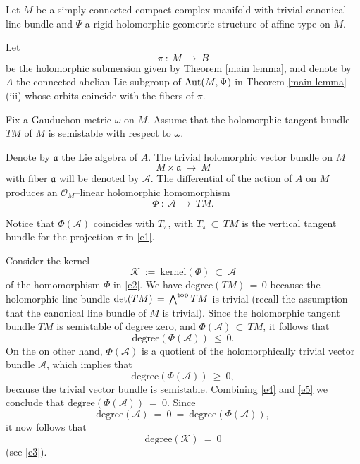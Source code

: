 \documentclass[12pt,reqno]{amsart}
\theoremstyle{definition}
\numberwithin{equation}{section}
\begin{document}
Let $M$ be a simply connected compact complex manifold with trivial canonical line bundle and $\Psi$ a rigid 
holomorphic geometric structure of affine type on $M$.

Let
\begin{equation}\label{e1}
\pi\ :\ M\ \longrightarrow\ B
\end{equation}
be the holomorphic submersion given by Theorem \ref{main lemma}, and denote by $A$ the connected abelian 
Lie subgroup of ${\rm Aut}(M, \Psi)$ in Theorem \ref{main lemma}(iii) whose orbits coincide with the fibers 
of $\pi$.

Fix a Gauduchon metric $\omega$ on $M$. Assume that the holomorphic tangent bundle $TM$ of $M$ is 
semistable with respect to $\omega$.

Denote by $\mathfrak a$ the Lie algebra of $A$. The trivial holomorphic vector bundle on $M$
$$
M\times {\mathfrak a}\ \longrightarrow\ M
$$
with fiber $\mathfrak a$ will be denoted by $\mathcal A$. The differential of the action of $A$ on $M$
produces an ${\mathcal O}_M$--linear holomorphic homomorphism 
\begin{equation}\label{e2}
\Phi\ :\ \mathcal A \ \longrightarrow\ TM.
\end{equation}

Notice that $\Phi(\mathcal A)$ coincides with $T_{\pi}$, with $T_\pi\, \subset\, TM$ is the vertical
tangent bundle for the projection $\pi$ in \eqref{e1}. 

Consider the kernel
\begin{equation}\label{e3}
{\mathcal K}\ := \ \text{kernel}(\Phi) \ \subset\ \mathcal A
\end{equation}
of the homomorphism $\Phi$ in \eqref{e2}. We have $\text{degree}(TM)\,=\, 0$ because the holomorphic
line bundle $\det(TM)\,=\, \bigwedge^{\rm top}TM$ is trivial (recall the assumption that the
canonical line bundle of $M$ is trivial). Since the holomorphic tangent bundle $TM$ is semistable of
degree zero, and $\Phi(\mathcal A)\, \subset\, TM$, it follows that
\begin{equation}\label{e4}
\text{degree}(\Phi(\mathcal A)) \ \leq \ 0.
\end{equation}
On the on other hand, $\Phi(\mathcal A)$ is a quotient of the holomorphically trivial vector
bundle $\mathcal A$, which implies that
\begin{equation}\label{e5}
\text{degree}(\Phi(\mathcal A)) \ \geq \ 0,
\end{equation}
because the trivial vector bundle is semistable.
Combining \eqref{e4} and \eqref{e5} we conclude that $\text{degree}(\Phi(\mathcal A)) \ = \ 0$.
Since $$\text{degree}({\mathcal A})\ =\ 0\ =\ \text{degree}(\Phi(\mathcal A)),$$ it now follows that
\begin{equation}\label{dk}
\text{degree}({\mathcal K}) \ = \ 0
\end{equation}
(see \eqref{e3}).
\end{document}
